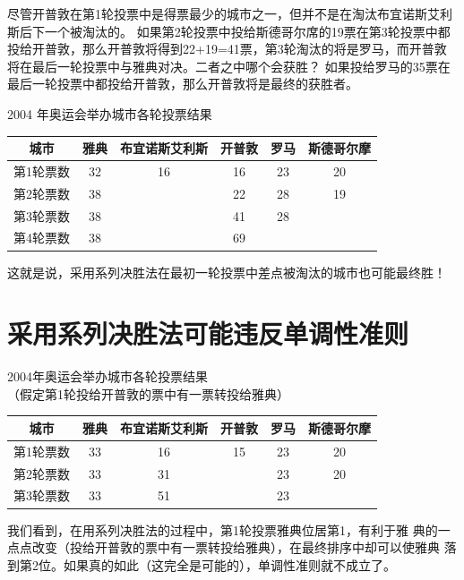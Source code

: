 \documentclass{beamer}
\begin{document}
\begin{frame}
    \begin{overprint}
         尽管开普敦在第1轮投票中是得票最少的城市之一，但并不是在淘汰布宜诺斯艾利斯后下一个被淘汰的。
         如果第2轮投票中投给斯德哥尔席的19票在第3轮投票中都投给开普敦，那么开普敦将得到22+19=41票，第3轮淘汰的将是罗马，而开普敦将在最后一轮投票中与雅典对决。二者之中哪个会获胜？
         如果投给罗马的35票在最后一轮投票中都投给开普敦，那么开普敦将是最终的获胜者。
    \end{overprint}
    \begin{table}{2004 年奥运会举办城市各轮投票结果}
        \begin{tabular}{cccccc}
            \toprule
            城市 & 雅典 & 布宜诺斯艾利斯 & 开普敦 & 罗马 & 斯德哥尔摩 \\
            \midrule 
             第1轮票数 & 32 & 16 & 16 & 23 & 20 \\
             第2轮票数 & 38 &    & 22 & 28 & 19 \\
             第3轮票数 & 38 &    & 41 & 28 &    \\
             第4轮票数 & 38 &    & 69 &    &    \\
            \bottomrule
        \end{tabular}
    \end{table}
         这就是说，采用系列决胜法在最初一轮投票中差点被淘汰的城市也可能最终胜！
\end{frame}

\section{采用系列决胜法可能违反单调性准则}

\begin{frame}
    \begin{table}{2004年奥运会举办城市各轮投票结果 \\ （假定第1轮投给开普敦的票中有一票转投给雅典）}
        \begin{tabular}{cccccc}
            \toprule
            城市 & 雅典 & 布宜诺斯艾利斯 & 开普敦 & 罗马 & 斯德哥尔摩 \\
            \midrule 
            \pause 第1轮票数 & 33 & 16 & 15 & 23 & 20 \\
            \pause 第2轮票数 & 33 & 31 &    & 23 & 20 \\
            \pause 第3轮票数 & 33 & 51 &    & 23 &    \\
            \bottomrule
        \end{tabular}
    \end{table}
\end{frame}

\begin{frame}
	我们看到，在用系列决胜法的过程中，第1轮投票雅典位居第1，有利于雅
	典的一点点改变（投给开普敦的票中有一票转投给雅典），在最终排序中却可以使雅典
	落到第2位。如果真的如此（这完全是可能的），单调性准则就不成立了。
\end{frame}

\backmatter
\end{document}
